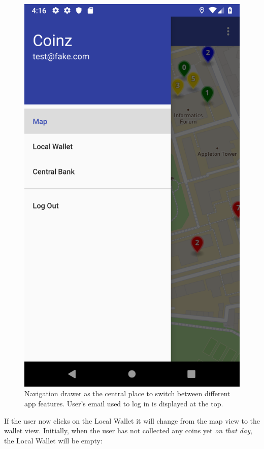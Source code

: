 \documentclass[11pt,a4paper,notitlepage]{article}
\begin{document}
\begin{figure}[H]
    \centering
    \includegraphics[scale=0.25]{screenshots/navigation-drawer/navigation-drawer-map-selected.png}
    \caption{Navigation drawer as the central place to switch between different app features. User's email used to log in is displayed at the top.}
\end{figure}

    If the user now clicks on the Local Wallet it will change from the map view to the wallet view. Initially, when the user has not collected any coins yet \emph{on that day}, the Local Wallet will be empty:
\end{document}
